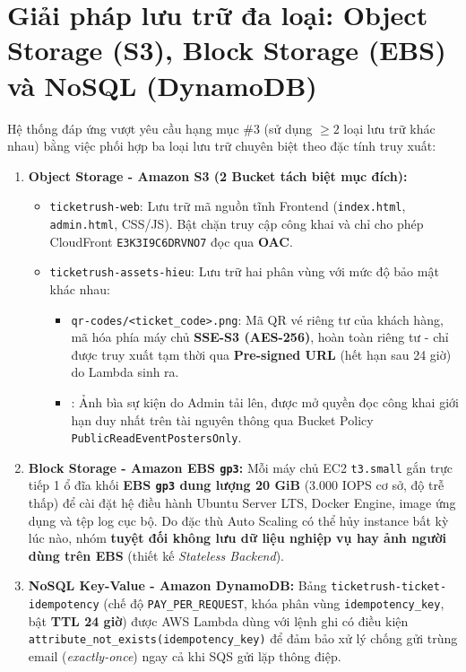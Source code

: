 \section{Giải pháp lưu trữ đa loại: Object Storage (S3), Block Storage (EBS) và NoSQL (DynamoDB)}
Hệ thống đáp ứng vượt yêu cầu hạng mục \#3 (sử dụng $\ge 2$ loại lưu trữ khác nhau) bằng việc phối hợp ba loại lưu trữ chuyên biệt theo đặc tính truy xuất:

\begin{enumerate}[leftmargin=1.5em]
  \item \textbf{Object Storage - Amazon S3 (2 Bucket tách biệt mục đích):}
    \begin{itemize}[leftmargin=1.2em]
      \item \texttt{ticketrush-web}: Lưu trữ mã nguồn tĩnh Frontend (\texttt{index.html}, \texttt{admin.html}, CSS/JS). Bật chặn truy cập công khai và chỉ cho phép CloudFront \texttt{E3K3I9C6DRVNO7} đọc qua \textbf{OAC}.
      \item \texttt{ticketrush-assets-hieu}: Lưu trữ hai phân vùng với mức độ bảo mật khác nhau:
        \begin{itemize}[leftmargin=1.2em]
          \item \texttt{qr-codes/<ticket\_code>.png}: Mã QR vé riêng tư của khách hàng, mã hóa phía máy chủ \textbf{SSE-S3 (AES-256)}, hoàn toàn riêng tư - chỉ được truy xuất tạm thời qua \textbf{Pre-signed URL} (hết hạn sau 24 giờ) do Lambda sinh ra.
          \item {}: Ảnh bìa sự kiện do Admin tải lên, được mở quyền đọc công khai giới hạn duy nhất trên tài nguyên  thông qua Bucket Policy \texttt{PublicReadEventPostersOnly}.
        \end{itemize}
    \end{itemize}
  \item \textbf{Block Storage - Amazon EBS \texttt{gp3}:}
    Mỗi máy chủ EC2 \texttt{t3.small} gắn trực tiếp 1 ổ đĩa khối \textbf{EBS \texttt{gp3} dung lượng 20 GiB} (3.000 IOPS cơ sở, độ trễ thấp) để cài đặt hệ điều hành Ubuntu Server LTS, Docker Engine, image ứng dụng và tệp log cục bộ. Do đặc thù Auto Scaling có thể hủy instance bất kỳ lúc nào, nhóm \textbf{tuyệt đối không lưu dữ liệu nghiệp vụ hay ảnh người dùng trên EBS} (thiết kế \textit{Stateless Backend}).
  \item \textbf{NoSQL Key-Value - Amazon DynamoDB:}
    Bảng \texttt{ticketrush-ticket-idempotency} (chế độ \texttt{PAY\_PER\_REQUEST}, khóa phân vùng \texttt{idempotency\_key}, bật \textbf{TTL 24 giờ}) được AWS Lambda dùng với lệnh ghi có điều kiện \texttt{attribute\_not\_exists(idempotency\_key)} để đảm bảo xử lý chống gửi trùng email (\textit{exactly-once}) ngay cả khi SQS gửi lặp thông điệp.
\end{enumerate}

